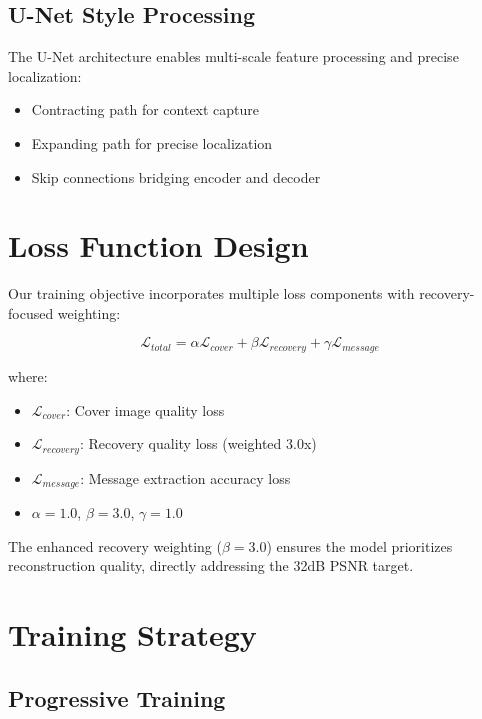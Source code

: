 \documentclass[12pt,a4paper]{report}
\begin{document}
\subsection{U-Net Style Processing}

The U-Net architecture enables multi-scale feature processing and precise localization:

\begin{itemize}
    \item Contracting path for context capture
    \item Expanding path for precise localization
    \item Skip connections bridging encoder and decoder
\end{itemize}

\section{Loss Function Design}

Our training objective incorporates multiple loss components with recovery-focused weighting:

\begin{equation}
\mathcal{L}_{total} = \alpha \mathcal{L}_{cover} + \beta \mathcal{L}_{recovery} + \gamma \mathcal{L}_{message}
\end{equation}

where:
\begin{itemize}
    \item $\mathcal{L}_{cover}$: Cover image quality loss
    \item $\mathcal{L}_{recovery}$: Recovery quality loss (weighted 3.0x)
    \item $\mathcal{L}_{message}$: Message extraction accuracy loss
    \item $\alpha = 1.0$, $\beta = 3.0$, $\gamma = 1.0$
\end{itemize}

The enhanced recovery weighting ($\beta = 3.0$) ensures the model prioritizes reconstruction quality, directly addressing the 32dB PSNR target.

\section{Training Strategy}

\subsection{Progressive Training}
\end{document}
